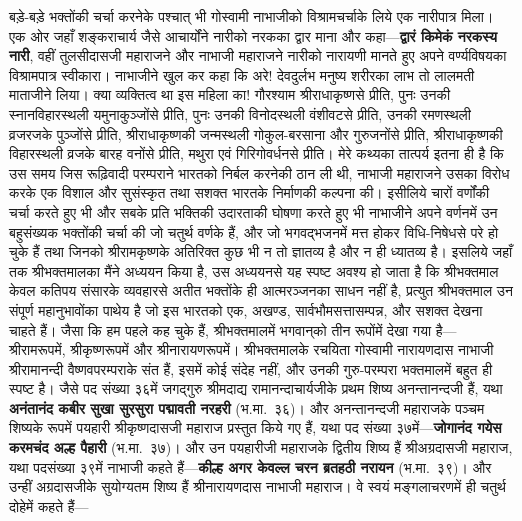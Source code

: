 \begin{sloppypar}\justifying{}
बड़े-बड़े भक्तोंकी चर्चा करनेके पश्चात् भी गोस्वामी नाभाजीको विश्रामचर्चाके लिये एक नारीपात्र मिला। एक ओर जहाँ शङ्कराचार्य जैसे आचार्योंने नारीको नरकका द्वार माना और कहा—\textbf{द्वारं किमेकं नरकस्य नारी}, वहीं तुलसीदासजी महाराजने और नाभाजी महाराजने नारीको नारायणी मानते हुए अपने वर्ण्यविषयका विश्राम\-पात्र स्वीकारा। नाभाजीने खुल कर कहा कि अरे! देवदुर्लभ मनुष्य शरीरका लाभ तो लालमती माताजीने लिया। क्या व्यक्तित्व था इस महिला का! गौरश्याम श्रीराधाकृष्णसे प्रीति, पुनः उनकी स्नान\-विहार\-स्थली यमुनाकुञ्जोंसे प्रीति, पुनः उनकी विनोदस्थली वंशीवटसे प्रीति, उनकी रमणस्थली व्रजरजके पुञ्जोंसे प्रीति, श्रीराधाकृष्णकी जन्मस्थली गोकुल-बरसाना और गुरुजनोंसे प्रीति, श्रीराधाकृष्णकी विहारस्थली व्रजके बारह वनोंसे प्रीति, मथुरा एवं गिरि\-गोवर्धनसे प्रीति।
मेरे कथ्यका तात्पर्य इतना ही है कि उस समय जिस रूढ़िवादी परम्पराने भारतको निर्बल करनेकी ठान ली थी, नाभाजी महाराजने उसका विरोध करके एक विशाल और सुसंस्कृत तथा सशक्त भारतके निर्माणकी कल्पना की। इसीलिये चारों वर्णोंकी चर्चा करते हुए भी और सबके प्रति भक्तिकी उदारताकी घोषणा करते हुए भी नाभाजीने अपने वर्णनमें उन बहुसंख्यक भक्तोंकी चर्चा की जो चतुर्थ वर्णके हैं, और जो भगवद्भजनमें मत्त होकर विधि-निषेधसे परे हो चुके हैं तथा जिनको श्रीरामकृष्णके अतिरिक्त कुछ भी न तो ज्ञातव्य है और न ही ध्यातव्य है। इसलिये जहाँ तक श्रीभक्तमालका मैंने अध्ययन किया है, उस अध्ययनसे यह स्पष्ट अवश्य हो जाता है कि श्रीभक्तमाल केवल कतिपय संसारके व्यवहारसे अतीत भक्तोंके ही आत्मरञ्जनका साधन नहीं है, प्रत्युत श्रीभक्तमाल उन संपूर्ण महानुभावोंका पाथेय है जो इस भारतको एक, अखण्ड, सार्वभौम\-सत्तासम्पन्न, और सशक्त देखना चाहते हैं। 
जैसा कि हम पहले कह चुके हैं, श्रीभक्तमालमें भगवान्‌को तीन रूपोंमें देखा गया है—श्रीरामरूपमें, श्रीकृष्णरूपमें और श्रीनारायणरूपमें। श्रीभक्तमालके रचयिता गोस्वामी नारायणदास नाभाजी श्रीरामानन्दी वैष्णव\-परम्पराके संत हैं, इसमें कोई संदेह नहीं, और उनकी गुरु-परम्परा भक्तमालमें बहुत ही स्पष्ट है। जैसे पद संख्या ३६में जगद्गुरु श्रीमदाद्य रामानन्दाचार्यजीके प्रथम शिष्य अनन्तानन्दजी हैं, यथा \textbf{अनंतानंद कबीर सुखा सुरसुरा पद्मावती नरहरी} (भ.मा.~३६)। और अनन्तानन्दजी महाराजके पञ्चम शिष्यके रूपमें पयहारी श्रीकृष्णदासजी महाराज प्रस्तुत किये गए हैं, यथा पद संख्या ३७में—\textbf{जोगानंद गयेस करमचंद अल्ह पैहारी} (भ.मा.~३७)। और उन पयहारीजी महाराजके द्वितीय शिष्य हैं श्रीअग्रदासजी महाराज, यथा पदसंख्या ३९में नाभाजी कहते हैं—\textbf{कील्ह अगर केवल्ल चरन ब्रतहठी नरायन} (भ.मा.~३९)। और उन्हीं अग्रदासजीके सुयोग्यतम शिष्य हैं श्रीनारायणदास नाभाजी महाराज। वे स्वयं मङ्गलाचरणमें ही चतुर्थ दोहेमें कहते हैं—
\end{sloppypar}

